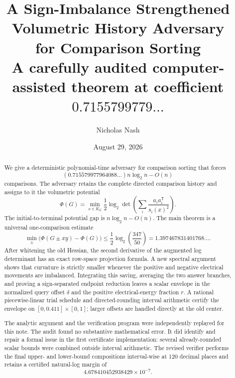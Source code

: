 \documentclass[11pt]{article}
\title{\textbf{A Sign-Imbalance Strengthened Volumetric History Adversary\\for Comparison Sorting}\\[1ex]
\large A carefully audited computer-assisted theorem at coefficient $0.7155799779\ldots$}
\author{Nicholas Nash}
\date{August 29, 2026}
\theoremstyle{definition}
\newcommand{\PhiV}{\Phi}
\begin{document}
\maketitle

\begin{abstract}
We give a deterministic polynomial-time adversary for comparison sorting that forces
\[
  \left(0.715579977964088\ldots\right)n\log_2 n-O(n)
\]
comparisons.  The adversary retains the complete directed comparison history and assigns to it the volumetric potential
\[
  \PhiV(G)=\min_{x\in K_G}\frac12\log_2\det\!\left(\sum_i\frac{a_i a_i^{\mathsf T}}{s_i(x)^2}\right).
\]
The initial-to-terminal potential gap is $n\log_2n-O(n)$.  The main theorem is a universal one-comparison estimate
\[
  \min_{\pm}\bigl(\PhiV(G\pm xy)-\PhiV(G)\bigr)
  \le \frac12\log_2\!\left(\frac{347}{50}\right)
  =1.397467831401768\ldots .
\]
After whitening the old Hessian, the second derivative of the augmented log determinant has an exact row-space projection formula.  A new spectral argument shows that curvature is strictly smaller whenever the positive and negative electrical movements are imbalanced.  Integrating this saving, averaging the two answer branches, and proving a sign-separated endpoint reduction leaves a scalar envelope in the normalized query offset $\delta$ and the positive electrical-energy fraction $r$.  A rational piecewise-linear trial schedule and directed-rounding interval arithmetic certify the envelope on $[0,0.411]\times[0,1]$; larger offsets are handled directly at the old center.

The analytic argument and the verification program were independently replayed for this note.  The audit found no substantive mathematical error.  It did identify and repair a formal issue in the first certificate implementation: several already-rounded scalar bounds were combined outside interval arithmetic.  The revised verifier performs the final upper- and lower-bound compositions interval-wise at 120 decimal places and retains a certified natural-log margin of
\[
  4.678410452938429\times 10^{-7}.
\]
\end{abstract}

\begin{center}
\end{center}
\end{document}
